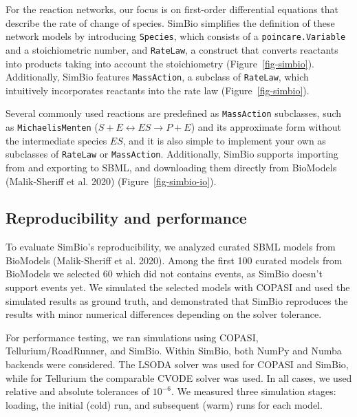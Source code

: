 \documentclass[
  a4paper,
  DIV=11,
  numbers=noendperiod]{scrartcl}
\begin{document}


For the reaction networks, our focus is on first-order differential
equations that describe the rate of change of species. SimBio simplifies
the definition of these network models by introducing \texttt{Species},
which consists of a \texttt{poincare.Variable} and a stoichiometric
number, and \texttt{RateLaw}, a construct that converts reactants into
products taking into account the stoichiometry
(Figure~\ref{fig-simbio}). Additionally, SimBio features
\texttt{MassAction}, a subclass of \texttt{RateLaw}, which intuitively
incorporates reactants into the rate law (Figure~\ref{fig-simbio}).

Several commonly used reactions are predefined as \texttt{MassAction}
subclasses, such as \texttt{MichaelisMenten}
(\(S + E \leftrightarrow ES \rightarrow P + E\)) and its approximate
form without the intermediate species \(ES\), and it is also simple to
implement your own as subclasses of \texttt{RateLaw} or
\texttt{MassAction}. Additionally, SimBio supports importing from and
exporting to SBML, and downloading them directly from BioModels
(Malik-Sheriff et al. 2020) (Figure~\ref{fig-simbio-io}).



\hypertarget{reproducibility-and-performance}{%
\subsection{Reproducibility and
performance}\label{reproducibility-and-performance}}



To evaluate SimBio's reproducibility, we analyzed curated SBML models
from BioModels (Malik-Sheriff et al. 2020). Among the first 100 curated
models from BioModels we selected 60 which did not contains events, as
SimBio doesn't support events yet. We simulated the selected models with
COPASI and used the simulated results as ground truth, and demonstrated
that SimBio reproduces the results with minor numerical differences
depending on the solver tolerance.

For performance testing, we ran simulations using COPASI,
Tellurium/RoadRunner, and SimBio. Within SimBio, both NumPy and Numba
backends were considered. The LSODA solver was used for COPASI and
SimBio, while for Tellurium the comparable CVODE solver was used. In all
cases, we used relative and absolute tolerances of \(10^{-6}\). We
measured three simulation stages: loading, the initial (cold) run, and
subsequent (warm) runs for each model.
\end{document}
